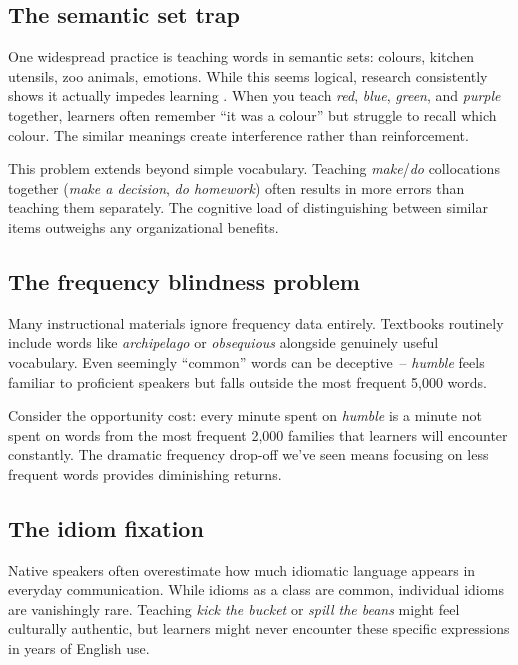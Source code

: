 \subsection{The semantic set trap}

One widespread practice is teaching words in semantic sets: colours, kitchen utensils, zoo animals, emotions. While this seems logical, research consistently shows it actually impedes learning \citep{finkbeiner2003semantic, waring1997negative}. When you teach \textit{red}, \textit{blue}, \textit{green}, and \textit{purple} together, learners often remember ``it was a colour'' but struggle to recall which colour. The similar meanings create interference rather than reinforcement.

This problem extends beyond simple vocabulary. Teaching \textit{make}/\textit{do} collocations together (\textit{make a decision}, \textit{do homework}) often results in more errors than teaching them separately. The cognitive load of distinguishing between similar items outweighs any organizational benefits.

\subsection{The frequency blindness problem}

Many instructional materials ignore frequency data entirely. Textbooks routinely include words like \textit{archipelago} or \textit{obsequious} alongside genuinely useful vocabulary. Even seemingly ``common'' words can be deceptive~-- \textit{humble} feels familiar to proficient speakers but falls outside the most frequent 5,000 words.

Consider the opportunity cost: every minute spent on \textit{humble} is a minute not spent on words from the most frequent 2,000 families that learners will encounter constantly. The dramatic frequency drop-off we've seen means focusing on less frequent words provides diminishing returns.

\subsection{The idiom fixation}

Native speakers often overestimate how much idiomatic language appears in everyday communication. While idioms as a class are common, individual idioms are vanishingly rare. Teaching \textit{kick the bucket} or \textit{spill the beans} might feel culturally authentic, but learners might never encounter these specific expressions in years of English use.

